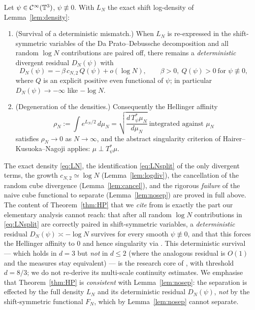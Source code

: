 \begin{qonetheorem}[Hairer--Peroni \cite{HP25}; singularity in $d=3$]\label{thm:HP}
Let $\psi\in\mathcal{C}^\infty(\mathbb{T}^3)$, $\psi\not\equiv0$. With $L_N$ the exact shift
log-density of Lemma~\ref{lem:density}:
\begin{enumerate}
\item[(i)] (Survival of a deterministic mismatch.) When $L_N$ is re-expressed in the
shift-symmetric variables of the Da Prato--Debussche decomposition and all random
$\log N$ contributions are paired off, there remains a \emph{deterministic} divergent
residual $D_N(\psi)$ with
\[
D_N(\psi)=-\,\beta\,c_{N,2}\,Q(\psi)+o(\log N),\qquad \beta>0,\ Q(\psi)>0\ \text{for }\psi\not\equiv0,
\]
where $Q$ is an explicit positive even functional of $\psi$; in particular
$D_N(\psi)\to-\infty$ like $-\log N$.
\item[(ii)] (Degeneration of the densities.) Consequently the Hellinger affinity
\[
\rho_N:=\int e^{L_N/2}\,d\mu_N=\sqrt{\frac{d\,T_\psi^*\mu_N}{d\mu_N}}\ \text{integrated against }\mu_N
\]
satisfies $\rho_N\to0$ as $N\to\infty$, and the abstract singularity criterion of
Hairer--Kusuoka--Nagoji \cite{HKN24} applies: $\mu\perp T_\psi^*\mu$.
\end{enumerate}
\end{qonetheorem}

\begin{remark}
The exact density \eqref{eq:LN}, the identification \eqref{eq:LNsplit} of the only
divergent terms, the growth $c_{N,2}\simeq\log N$ (Lemma~\ref{lem:logdiv}), the
cancellation of the random cube divergence (Lemma~\ref{lem:cancel}), and the rigorous
\emph{failure} of the naive cube functional to separate (Lemma~\ref{lem:nosep}) are
proved in full above. The content of Theorem~\ref{thm:HP} that we \emph{cite} from
\cite{HP25,HKN24} is exactly the part our elementary analysis cannot reach: that after
all random $\log N$ contributions in \eqref{eq:LNsplit} are correctly paired in
shift-symmetric variables, a \emph{deterministic} residual $D_N(\psi)\asymp-\log N$
survives for every smooth $\psi\not\equiv0$, and that this forces the Hellinger
affinity to $0$ and hence singularity via \cite{HKN24}. This deterministic survival ---
which holds in $d=3$ but \emph{not} in $d\le2$ (where the analogous residual is
$O(1)$ and the measures stay equivalent) --- is the research core of \cite{HP25}, with
threshold $d=8/3$; we do not re-derive its multi-scale continuity estimates. We
emphasise that Theorem~\ref{thm:HP} is \emph{consistent} with Lemma~\ref{lem:nosep}: the
separation is effected by the full density $L_N$ and its deterministic residual
$D_N(\psi)$, \emph{not} by the shift-symmetric functional $F_N$, which by
Lemma~\ref{lem:nosep} cannot separate.
\end{remark}

